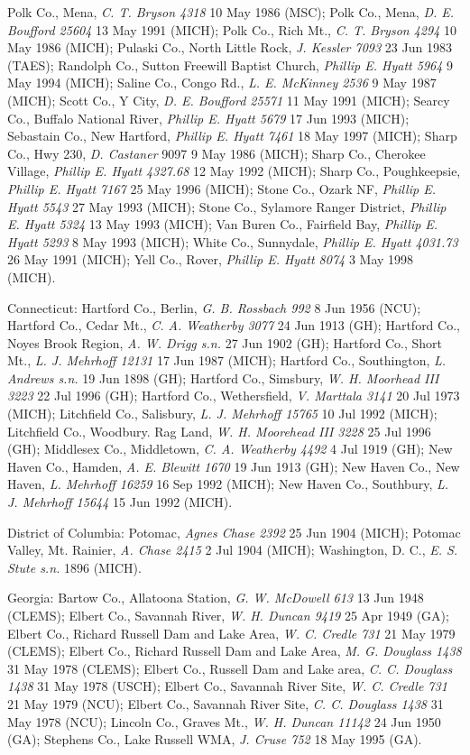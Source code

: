 \documentclass{article}
\begin{document}
Polk Co., Mena, \textit{C. T. Bryson 4318} 10 May 1986 (MSC);
Polk Co., Mena, \textit{D. E. Boufford 25604} 13 May 1991 (MICH);
Polk Co., Rich Mt., \textit{C. T. Bryson 4294} 10 May 1986 (MICH);
Pulaski Co., North Little Rock, \textit{J. Kessler 7093} 23 Jun 1983 (TAES);
Randolph Co.,  Sutton Freewill Baptist Church, \textit{Phillip E. Hyatt 5964} 9 May 1994 (MICH);
Saline Co., Congo Rd., \textit{L. E. McKinney 2536} 9 May 1987 (MICH);
Scott Co., Y City, \textit{D. E. Boufford 25571} 11 May 1991 (MICH);
Searcy Co., Buffalo National River, \textit{Phillip E. Hyatt 5679} 17 Jun 1993 (MICH);
Sebastain Co., New Hartford, \textit{Phillip E. Hyatt 7461} 18 May 1997 (MICH);
Sharp Co., Hwy 230, \textit{D. Castaner} 9097 9 May 1986 (MICH);
Sharp Co., Cherokee Village, \textit{Phillip E. Hyatt 4327.68} 12 May 1992 (MICH);
Sharp Co., Poughkeepsie, \textit{Phillip E. Hyatt 7167} 25 May 1996 (MICH);
Stone Co., Ozark NF, \textit{Phillip E. Hyatt 5543} 27 May 1993 (MICH);
Stone Co., Sylamore Ranger District, \textit{Phillip E. Hyatt 5324} 13 May 1993 (MICH);
Van Buren Co., Fairfield Bay, \textit{Phillip E. Hyatt 5293} 8 May 1993 (MICH);
White Co., Sunnydale, \textit{Phillip E. Hyatt 4031.73} 26 May 1991 (MICH);
Yell Co., Rover, \textit{Phillip E. Hyatt 8074} 3 May 1998 (MICH).

Connecticut:
Hartford Co., Berlin, \textit{G. B. Rossbach 992} 8 Jun 1956 (NCU);
Hartford Co., Cedar Mt., \textit{C. A. Weatherby 3077} 24 Jun 1913 (GH);
Hartford Co., Noyes Brook Region, \textit{A. W. Drigg s.n.} 27 Jun 1902 (GH);
Hartford Co., Short Mt., \textit{L. J. Mehrhoff 12131} 17 Jun 1987 (MICH);
Hartford Co., Southington, \textit{L. Andrews s.n.} 19 Jun 1898 (GH);
Hartford Co., Simsbury, \textit{W. H. Moorhead III 3223} 22 Jul 1996 (GH);
Hartford Co., Wethersfield, \textit{V. Marttala 3141} 20 Jul 1973 (MICH);
Litchfield Co., Salisbury, \textit{L. J. Mehrhoff 15765} 10 Jul 1992 (MICH);
Litchfield Co., Woodbury. Rag Land, \textit{W. H. Moorehead III 3228} 25 Jul 1996 (GH);
Middlesex Co., Middletown, \textit{C. A. Weatherby 4492} 4 Jul 1919 (GH);
New Haven Co., Hamden, \textit{A. E. Blewitt 1670} 19 Jun 1913 (GH);
New Haven Co., New Haven, \textit{L. Mehrhoff 16259} 16 Sep 1992 (MICH);
New Haven Co., Southbury, \textit{L. J. Mehrhoff 15644} 15 Jun 1992 (MICH).

District of Columbia:
Potomac, \textit{Agnes Chase 2392} 25 Jun 1904 (MICH);
Potomac Valley, Mt. Rainier, \textit{A. Chase 2415} 2 Jul 1904 (MICH);
Washington, D. C., \textit{E. S. Stute s.n.} 1896 (MICH).

Georgia:
Bartow Co., Allatoona Station, \textit{G. W. McDowell 613} 13 Jun 1948 (CLEMS);
Elbert Co., Savannah River, \textit{W. H. Duncan 9419} 25 Apr 1949 (GA);
Elbert Co., Richard Russell Dam and Lake Area, \textit{W. C. Credle 731} 21 May 1979 (CLEMS);
Elbert Co., Richard Russell Dam and Lake Area, \textit{M. G. Douglass 1438} 31 May 1978 (CLEMS);
Elbert Co., Russell Dam and Lake area, \textit{C. C. Douglass 1438} 31 May 1978 (USCH);
Elbert Co., Savannah River Site, \textit{W. C. Credle 731} 21 May 1979 (NCU);
Elbert Co., Savannah River Site, \textit{C. C. Douglass 1438} 31 May 1978 (NCU);
Lincoln Co., Graves Mt., \textit{W. H. Duncan 11142} 24 Jun 1950 (GA);
Stephens Co., Lake Russell WMA, \textit{J. Cruse 752} 18 May 1995 (GA).
\end{document}
